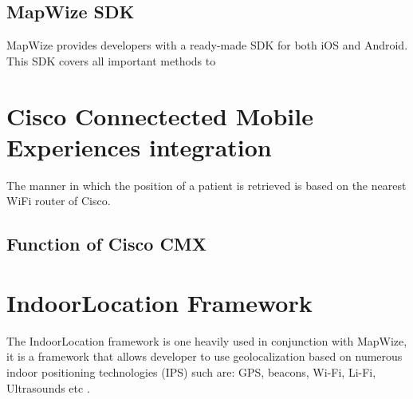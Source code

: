 \subsection{MapWize SDK}
MapWize provides developers with a ready-made SDK for both iOS and Android. This SDK covers all important methods to 
\section{Cisco Connectected Mobile Experiences integration}
The manner in which the position of a patient is retrieved is based on the nearest WiFi router of Cisco.
\subsection{Function of Cisco CMX}
\section{IndoorLocation Framework}
The IndoorLocation framework is one heavily used in conjunction with MapWize, it is a framework that allows developer to use geolocalization based on numerous indoor positioning technologies (IPS) such are: GPS, beacons, Wi-Fi, Li-Fi, Ultrasounds etc \cite{IndoorLocation.io2019}.



